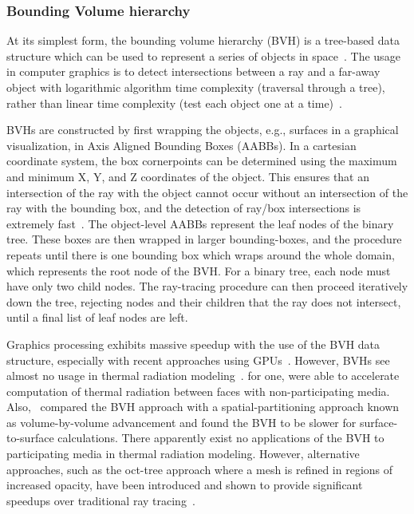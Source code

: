 \subsubsection{Bounding Volume hierarchy}
At its simplest form, the bounding volume hierarchy (BVH) is a tree-based data structure which can be used to represent a series of objects in space~\cite{Shirley2020RayWeek,Meister2021ATracing}. The usage in computer graphics is to detect intersections between a ray and a far-away object with logarithmic algorithm time complexity (traversal through a tree), rather than linear time complexity (test each object one at a time)~\cite{Zeeb2001AnGeometries}.

BVHs are constructed by first wrapping the objects, e.g., surfaces in a graphical visualization, in Axis Aligned Bounding Boxes (AABBs). In a cartesian coordinate system, the box cornerpoints can be determined using the maximum and minimum X, Y, and Z coordinates of the object.
This ensures that an intersection of the ray with the object cannot occur without an intersection of the ray with the bounding box, and the detection of ray/box intersections is extremely fast~\cite{Kay1986RayScenes}.
The object-level AABBs represent the leaf nodes of the binary tree. These boxes are then wrapped in larger bounding-boxes, and the procedure repeats until there is one bounding box which wraps around the whole domain, which represents the root node of the BVH. 
For a binary tree, each node must have only two child nodes. The ray-tracing procedure can then proceed iteratively down the tree, rejecting nodes and their children that the ray does not intersect, until a final list of leaf nodes are left.

Graphics processing exhibits massive speedup with the use of the BVH data structure, especially with recent approaches using GPUs~\cite{Nery2013ParallelGPGPUs,Meister2021ATracing,Karras2012MaximizingTrees}.
However, BVHs see almost no usage in thermal radiation modeling~\cite{Liu2020TheFlames}.
\citet{Kuczynskia2014RadiationBoundaries} for one, were able to accelerate computation of thermal radiation between faces with non-participating media. 
Also,~\citet{Mazumder2006MethodsTransport} compared the BVH approach with a spatial-partitioning approach known as volume-by-volume advancement and found the BVH to be slower for surface-to-surface calculations. 
There apparently exist no applications of the BVH to participating media in thermal radiation modeling. However, alternative approaches, such as the oct-tree approach where a mesh is refined in regions of increased opacity, have been introduced and shown to provide significant speedups over traditional ray tracing~\cite{Saftly2013UsingNote,Villefranque2019AAtmospheres}.

